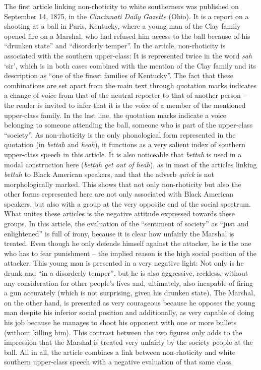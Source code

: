 The first article linking non-rhoticity to white southerners was published on September 14, 1875, in the \emph{Cincinnati Daily Gazette} (Ohio). It is a report on a shooting at a ball in Paris, Kentucky, where a young man of the Clay family opened fire on a Marshal, who had refused him access to the ball because of his “drunken state” and “disorderly temper”. In the article, non-rhoticity is associated with the southern upper-class: It is represented twice in the word \emph{sah} ‘sir’, which is in both cases combined with the mention of the Clay family and its description as “one of the finest families of Kentucky”. The fact that these combinations are set apart from the main text through quotation marks indicates a change of voice from that of the neutral reporter to that of another person – the reader is invited to infer that it is the voice of a member of the mentioned upper-class family. In the last line, the quotation marks indicate a voice belonging to someone attending the ball, someone who is part of the upper-class “society”. As non-rhoticity is the only phonological form represented in the quotation (in \emph{bettah} and \emph{heah}), it functions as a very salient index of southern upper-class speech in this article. It is also noticeable that \emph{bettah} is used in a modal construction here (\emph{bettah get out of heah}), as in most of the articles linking \emph{bettah} to Black American speakers, and that the adverb \emph{quick} is not morphologically marked. This shows that not only non-rhoticity but also the other forms represented here are not only associated with Black American speakers, but also with a group at the very opposite end of the social spectrum. What unites these articles is the negative attitude expressed towards these groups. In this article, the evaluation of the “sentiment of society” as “just and enlightened” is full of irony, because it is clear how unfairly the Marshal is treated. Even though he only defends himself against the attacker, he is the one who has to fear punishment – the implied reason is the high social position of the attacker. This young man is presented in a very negative light: Not only is he drunk and “in a disorderly temper”, but he is also aggressive, reckless, without any consideration for other people’s lives and, ultimately, also incapable of firing a gun accurately (which is not surprising, given his drunken state). The Marshal, on the other hand, is presented as very courageous because he opposes the young man despite his inferior social position and additionally, as very capable of doing his job because he manages to shoot his opponent with one or more bullets (without killing him). This contrast between the two figures only adds to the impression that the Marshal is treated very unfairly by the society people at the ball. All in all, the article combines a link between non-rhoticity and white southern upper-class speech with a negative evaluation of that same class.

